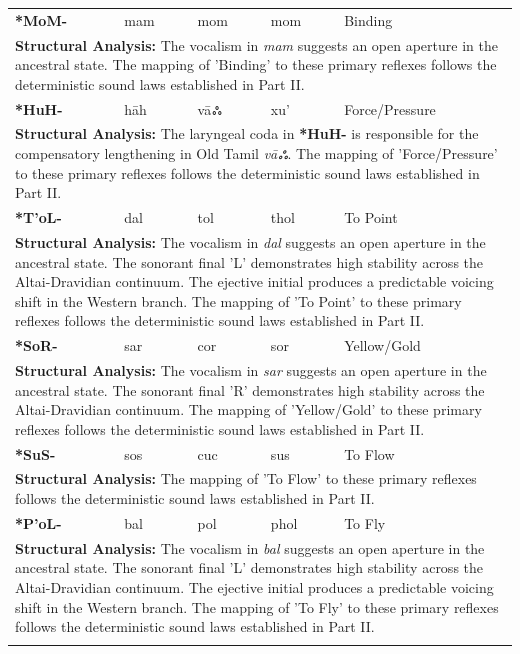 \begin{longtable}{p{} p{} p{} p{} p{}}
\textbf{*MoM-} & mam & mom & mom & Binding \\ 
\multicolumn{5}{p{\textwidth}}{\small \textbf{Structural Analysis:} The vocalism in \textit{mam} suggests an open aperture in the ancestral state. The mapping of 'Binding' to these primary reflexes follows the deterministic sound laws established in Part II.} \\ \addlinespace[15pt] 
\textbf{*HuH-} & hāh & vāஃ & xu' & Force/Pressure \\ 
\multicolumn{5}{p{\textwidth}}{\small \textbf{Structural Analysis:} The laryngeal coda in \textbf{*HuH-} is responsible for the compensatory lengthening in Old Tamil \textit{vāஃ}. The mapping of 'Force/Pressure' to these primary reflexes follows the deterministic sound laws established in Part II.} \\ \addlinespace[15pt] 
\textbf{*T'oL-} & dal & tol & thol & To Point \\ 
\multicolumn{5}{p{\textwidth}}{\small \textbf{Structural Analysis:} The vocalism in \textit{dal} suggests an open aperture in the ancestral state. The sonorant final 'L' demonstrates high stability across the Altai-Dravidian continuum. The ejective initial produces a predictable voicing shift in the Western branch. The mapping of 'To Point' to these primary reflexes follows the deterministic sound laws established in Part II.} \\ \addlinespace[15pt] 
\textbf{*SoR-} & sar & cor & sor & Yellow/Gold \\ 
\multicolumn{5}{p{\textwidth}}{\small \textbf{Structural Analysis:} The vocalism in \textit{sar} suggests an open aperture in the ancestral state. The sonorant final 'R' demonstrates high stability across the Altai-Dravidian continuum. The mapping of 'Yellow/Gold' to these primary reflexes follows the deterministic sound laws established in Part II.} \\ \addlinespace[15pt] 
\textbf{*SuS-} & sos & cuc & sus & To Flow \\ 
\multicolumn{5}{p{\textwidth}}{\small \textbf{Structural Analysis:}  The mapping of 'To Flow' to these primary reflexes follows the deterministic sound laws established in Part II.} \\ \addlinespace[15pt] 
\textbf{*P'oL-} & bal & pol & phol & To Fly \\ 
\multicolumn{5}{p{\textwidth}}{\small \textbf{Structural Analysis:} The vocalism in \textit{bal} suggests an open aperture in the ancestral state. The sonorant final 'L' demonstrates high stability across the Altai-Dravidian continuum. The ejective initial produces a predictable voicing shift in the Western branch. The mapping of 'To Fly' to these primary reflexes follows the deterministic sound laws established in Part II.} \\ \addlinespace[15pt] 

\end{longtable}
